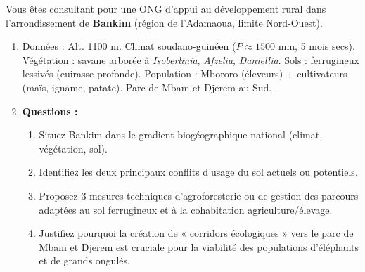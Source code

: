 \documentclass[11pt]{article}
\begin{document}
\begin{exercice}
Vous êtes consultant pour une ONG d'appui au développement rural dans l'arrondissement de \textbf{Bankim} (région de l'Adamaoua, limite Nord-Ouest).
\begin{enumerate}
    \item Données : Alt. 1100 m. Climat soudano-guinéen ($P \approx 1500$ mm, 5 mois secs). Végétation : savane arborée à \emph{Isoberlinia}, \emph{Afzelia}, \emph{Daniellia}. Sols : ferrugineux lessivés (cuirasse profonde). Population : Mbororo (éleveurs) + cultivateurs (maïs, igname, patate). Parc de Mbam et Djerem au Sud.
    \item \textbf{Questions :}
    \begin{enumerate}
        \item Situez Bankim dans le gradient biogéographique national (climat, végétation, sol).
        \item Identifiez les deux principaux conflits d'usage du sol actuels ou potentiels.
        \item Proposez 3 mesures techniques d'agroforesterie ou de gestion des parcours adaptées au sol ferrugineux et à la cohabitation agriculture/élevage.
        \item Justifiez pourquoi la création de « corridors écologiques » vers le parc de Mbam et Djerem est cruciale pour la viabilité des populations d'éléphants et de grands ongulés.
    \end{enumerate}
\end{enumerate}
\end{exercice}
\end{document}
